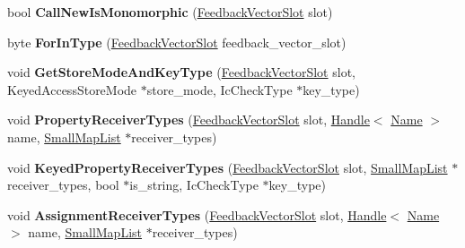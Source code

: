 \begin{DoxyCompactItemize}
\item 
bool {\bfseries Call\+New\+Is\+Monomorphic} (\hyperlink{classv8_1_1internal_1_1_feedback_vector_slot}{Feedback\+Vector\+Slot} slot)\hypertarget{classv8_1_1internal_1_1_type_feedback_oracle_a4c0543c645240331236b90310925a201}{}\label{classv8_1_1internal_1_1_type_feedback_oracle_a4c0543c645240331236b90310925a201}

\item 
byte {\bfseries For\+In\+Type} (\hyperlink{classv8_1_1internal_1_1_feedback_vector_slot}{Feedback\+Vector\+Slot} feedback\+\_\+vector\+\_\+slot)\hypertarget{classv8_1_1internal_1_1_type_feedback_oracle_a21fb85b281c60fe0fb3aa2d3b7ce0f18}{}\label{classv8_1_1internal_1_1_type_feedback_oracle_a21fb85b281c60fe0fb3aa2d3b7ce0f18}

\item 
void {\bfseries Get\+Store\+Mode\+And\+Key\+Type} (\hyperlink{classv8_1_1internal_1_1_feedback_vector_slot}{Feedback\+Vector\+Slot} slot, Keyed\+Access\+Store\+Mode $\ast$store\+\_\+mode, Ic\+Check\+Type $\ast$key\+\_\+type)\hypertarget{classv8_1_1internal_1_1_type_feedback_oracle_ac1255429986f0756d03bfce5e430305b}{}\label{classv8_1_1internal_1_1_type_feedback_oracle_ac1255429986f0756d03bfce5e430305b}

\item 
void {\bfseries Property\+Receiver\+Types} (\hyperlink{classv8_1_1internal_1_1_feedback_vector_slot}{Feedback\+Vector\+Slot} slot, \hyperlink{classv8_1_1internal_1_1_handle}{Handle}$<$ \hyperlink{classv8_1_1internal_1_1_name}{Name} $>$ name, \hyperlink{classv8_1_1internal_1_1_small_map_list}{Small\+Map\+List} $\ast$receiver\+\_\+types)\hypertarget{classv8_1_1internal_1_1_type_feedback_oracle_a5678767c5e1f6383a428c785f6e8ce42}{}\label{classv8_1_1internal_1_1_type_feedback_oracle_a5678767c5e1f6383a428c785f6e8ce42}

\item 
void {\bfseries Keyed\+Property\+Receiver\+Types} (\hyperlink{classv8_1_1internal_1_1_feedback_vector_slot}{Feedback\+Vector\+Slot} slot, \hyperlink{classv8_1_1internal_1_1_small_map_list}{Small\+Map\+List} $\ast$receiver\+\_\+types, bool $\ast$is\+\_\+string, Ic\+Check\+Type $\ast$key\+\_\+type)\hypertarget{classv8_1_1internal_1_1_type_feedback_oracle_ae63227e43a40b956988b66f68e6936be}{}\label{classv8_1_1internal_1_1_type_feedback_oracle_ae63227e43a40b956988b66f68e6936be}

\item 
void {\bfseries Assignment\+Receiver\+Types} (\hyperlink{classv8_1_1internal_1_1_feedback_vector_slot}{Feedback\+Vector\+Slot} slot, \hyperlink{classv8_1_1internal_1_1_handle}{Handle}$<$ \hyperlink{classv8_1_1internal_1_1_name}{Name} $>$ name, \hyperlink{classv8_1_1internal_1_1_small_map_list}{Small\+Map\+List} $\ast$receiver\+\_\+types)\hypertarget{classv8_1_1internal_1_1_type_feedback_oracle_a83a271e3ba2d242b907a968201baa7f1}{}\label{classv8_1_1internal_1_1_type_feedback_oracle_a83a271e3ba2d242b907a968201baa7f1}


\end{DoxyCompactItemize}

